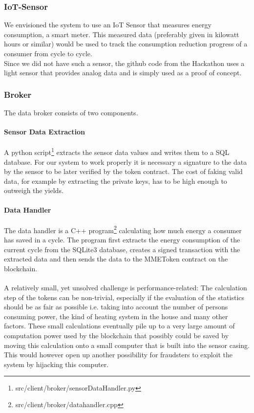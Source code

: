 \documentclass[11pt]{article}
\begin{document}
\subsubsection{IoT-Sensor}
We envisioned the system to use an IoT Sensor that measures energy consumption, a smart meter. This measured data (preferably given in kilowatt hours or similar) would be used to track the consumption reduction progress of a consumer from cycle to cycle. \\
Since we did not have such a sensor, the github code from the Hackathon uses a light sensor that provides analog data and is simply used as a proof of concept.

\subsubsection{Broker}
The data broker consists of two components.
\paragraph{Sensor Data Extraction}
A python script\footnote{src/client/broker/sensorDataHandler.py} extracts the sensor data values and writes them to a SQL database.
For our system to work properly it is necessary a signature to the data by the sensor to be later verified by the token contract. The cost of faking valid data, for example by extracting the private keys, has to be high enough to outweigh the yields.
\paragraph{Data Handler}
The data handler is a C++ program\footnote{src/client/broker/datahandler.cpp} calculating how much energy a consumer has saved in a cycle. The program first extracts the energy consumption of the current cycle from the SQLite3 database, creates a signed transaction with the extracted data and then sends the data to the MMEToken contract on the blockchain.\\\\
A relatively small, yet unsolved challenge is performance-related: The calculation step of the tokens can be non-trivial, especially if the evaluation of the statistics should be as fair as possible i.e. taking into account the number of persons consuming power, the kind of heating system in the house and many other factors. These small calculations eventually pile up to a very large amount of computation power used by the blockchain that possibly could be saved by moving this calculation onto a small computer
that is built into the sensor casing. This would however open up another possibility for fraudsters to exploit the system by hijacking this computer.
\end{document}
